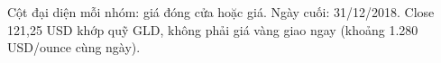 Cột đại diện mỗi nhóm: giá đóng cửa hoặc giá. Ngày cuối: 31/12/2018. Close 121{,}25 USD khớp quỹ GLD, không phải giá vàng giao ngay (khoảng 1.280 USD/ounce cùng ngày).
